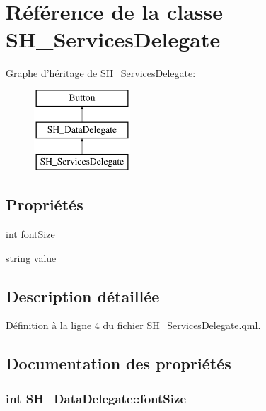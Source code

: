 \hypertarget{classSH__ServicesDelegate}{\section{Référence de la classe S\-H\-\_\-\-Services\-Delegate}
\label{classSH__ServicesDelegate}
}
Graphe d'héritage de S\-H\-\_\-\-Services\-Delegate\-:\begin{figure}[H]
\begin{center}
\leavevmode
\includegraphics[height=3.000000cm]{classSH__ServicesDelegate}
\end{center}
\end{figure}
\subsection*{Propriétés}
\begin{DoxyCompactItemize}
\item 
int \hyperlink{classSH__DataDelegate_afbb41ad9b513c7f27e7b5ad90d82e95b}{font\-Size}
\item 
string \hyperlink{classSH__DataDelegate_acb9da3c73493c88865e08d9575f26482}{value}
\end{DoxyCompactItemize}


\subsection{Description détaillée}


Définition à la ligne \hyperlink{SH__ServicesDelegate_8qml_source_l00004}{4} du fichier \hyperlink{SH__ServicesDelegate_8qml_source}{S\-H\-\_\-\-Services\-Delegate.\-qml}.



\subsection{Documentation des propriétés}
\hypertarget{classSH__DataDelegate_afbb41ad9b513c7f27e7b5ad90d82e95b}{
\subsubsection[{font\-Size}]{\setlength{\rightskip}{0pt plus 5cm}int S\-H\-\_\-\-Data\-Delegate\-::font\-Size\hspace{0.3cm}{\ttfamily [inherited]}}}\label{classSH__DataDelegate_afbb41ad9b513c7f27e7b5ad90d82e95b}


